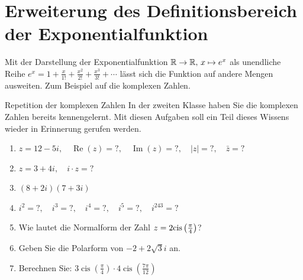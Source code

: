 \section{Erweiterung des Definitionsbereich der Exponentialfunktion}
Mit der Darstellung der Exponentialfunktion $\mathbb{R} \to \mathbb{R},\, x\mapsto e^x$ als unendliche Reihe $e^x = 1 + \frac{x}{1!}+ \frac{x^2}{2!}+ \frac{x^3}{3!}+\cdots$ lässt sich die Funktion auf andere Mengen ausweiten. Zum Beispiel auf die komplexen Zahlen.

\begin{LA}{Repetition der komplexen Zahlen}{}
	In der zweiten Klasse haben Sie die komplexen Zahlen bereits kennengelernt. Mit diesen Aufgaben soll ein Teil dieses Wissens wieder in Erinnerung gerufen werden.



	\begin{enumerate}
		\item $z = 12 - 5i, \quad \operatorname{Re}(z) =?, \quad \operatorname{Im}(z) = ? , \quad |z| = ?, \quad \bar{z}=?$

		\item $z = 3 + 4i, \quad i\cdot z = ?$

		\item \((8+2i)(7+3i)\)




		\item \(i^2=?,\quad i^3=?,\quad i^4=?,\quad i^5 =?,\quad i^{243} = ? \)

		\item Wie lautet die Normalform der Zahl $z = 2\mathrm{cis}\left(\frac{\pi}{4}\right)$?

		\item Geben Sie die Polarform von \(-2+2\sqrt{3}i\) an.

		\item Berechnen Sie: $3\operatorname{cis}\left(\frac{\pi}{4}\right) \cdot 4\operatorname{cis}\left(\frac{7\pi}{12}\right)$












\end{enumerate}
\end{LA}
